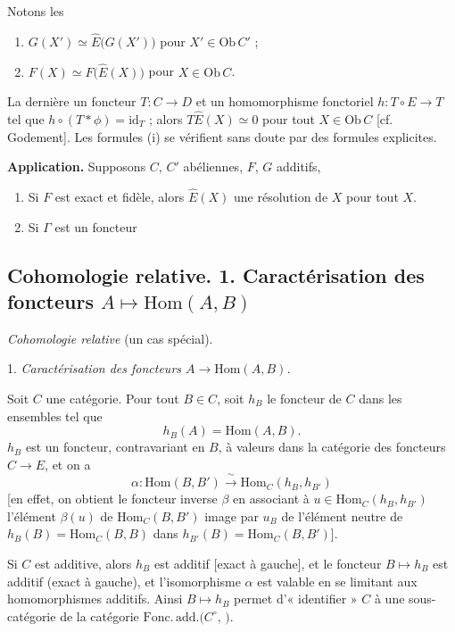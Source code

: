 \documentclass[11pt,a4paper]{article}
\begin{document}
Notons les 
\begin{enumerate}
  \item $G(X') \simeq \widehat{E}\bigl( G(X') \bigr)$ \quad pour
        $X' \in \mathrm{Ob}\, C'$ ;
  \item $F(X) \simeq F\bigl( \widehat{E}(X) \bigr)$ \quad pour
        $X \in \mathrm{Ob}\, C$.
\end{enumerate}
La dernière \ill{} un foncteur $T : C \to D$ et un homomorphisme fonctoriel
$h : T \circ E \to T$ tel que $h \circ (T * \phi) = \mathrm{id}_{T}$ ; alors
$T \widehat{E}(X) \simeq 0$ pour tout $X \in \mathrm{Ob}\, C$ [cf. Godement].
Les formules (i) se vérifient sans doute  par des formules
explicites.

\textbf{Application.} Supposons $C$, $C'$ abéliennes, $F$, $G$ additifs,
\struck{\ill{}}
\begin{enumerate}
  \item Si $F$ est exact et fidèle, alors $\widehat{E}(X)$ \ill{} une
        résolution de $X$ pour tout $X$.
  \item Si $\Gamma$ est un foncteur
\end{enumerate}

\subsection*{Cohomologie relative. 1. Caractérisation des foncteurs $A \mapsto \mathrm{Hom}(A,B)$}

\emph{Cohomologie relative} (un cas spécial).

1. \emph{Caractérisation des foncteurs $A \to \mathrm{Hom}(A, B)$.}

Soit $C$ une catégorie. Pour tout $B \in C$, soit $h_{B}$ le foncteur de $C$
dans les ensembles tel que
\[
  h_{B}(A) = \mathrm{Hom}(A, B) .
\]
$h_{B}$ est un foncteur, contravariant en $B$, à valeurs dans la catégorie des
foncteurs $C \to E$, et on a
\[
  \alpha : \mathrm{Hom}(B, B') \xrightarrow{\ \sim\ }
  \mathrm{Hom}_{C}(h_{B}, h_{B'})
\]
[en effet, on obtient le foncteur inverse $\beta$ en associant à
$u \in \mathrm{Hom}_{C}(h_{B}, h_{B'})$ l'élément $\beta(u)$ de
$\mathrm{Hom}_{C}(B, B')$ image par $u_{B}$ de l'élément neutre de
$h_{B}(B) = \mathrm{Hom}_{C}(B, B)$ dans
$h_{B'}(B) = \mathrm{Hom}_{C}(B, B')$].

Si $C$ est additive, alors $h_{B}$ est additif [exact à gauche], et le foncteur
$B \mapsto h_{B}$ est additif (exact à gauche), et l'isomorphisme $\alpha$ est
valable en se limitant aux homomorphismes additifs. Ainsi $B \mapsto h_{B}$
permet d'« identifier » $C$ à une sous-catégorie de la catégorie
$\mathrm{Fonc.\,add.}(C^{\circ},\,$$)$.
\end{document}
